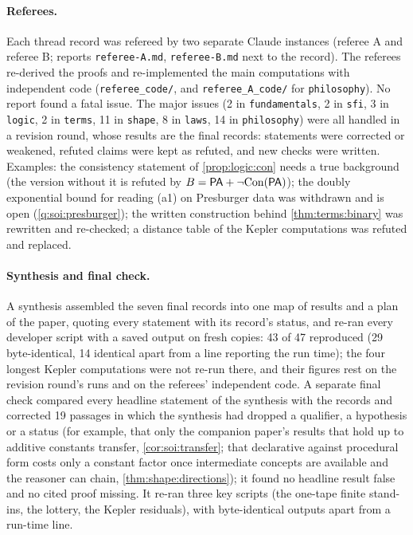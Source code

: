 \paragraph{Referees.} Each thread record was refereed by two separate Claude instances (referee A and referee B; reports \texttt{referee-A.md}, \texttt{referee-B.md} next to the record). The referees re-derived the proofs and re-implemented the main computations with independent code (\texttt{referee\_code/}, and \texttt{referee\_A\_code/} for \texttt{philosophy}). No report found a fatal issue. The major issues (2 in \texttt{fundamentals}, 2 in \texttt{sfi}, 3 in \texttt{logic}, 2 in \texttt{terms}, 11 in \texttt{shape}, 8 in \texttt{laws}, 14 in \texttt{philosophy}) were all handled in a revision round, whose results are the final records: statements were corrected or weakened, refuted claims were kept as refuted, and new checks were written. Examples: the consistency statement of \cref{prop:logic:con} needs a true background (the version without it is refuted by $B=\mathsf{PA}+\neg\mathrm{Con}(\mathsf{PA})$); the doubly exponential bound for reading (a1) on Presburger data was withdrawn and is open (\cref{q:soi:presburger}); the written construction behind \cref{thm:terms:binary} was rewritten and re-checked; a distance table of the Kepler computations was refuted and replaced.

\paragraph{Synthesis and final check.} A synthesis assembled the seven final records into one map of results and a plan of the paper, quoting every statement with its record's status, and re-ran every developer script with a saved output on fresh copies: 43 of 47 reproduced (29 byte-identical, 14 identical apart from a line reporting the run time); the four longest Kepler computations were not re-run there, and their figures rest on the revision round's runs and on the referees' independent code. A separate final check compared every headline statement of the synthesis with the records and corrected 19 passages in which the synthesis had dropped a qualifier, a hypothesis or a status (for example, that only the companion paper's results that hold up to additive constants transfer, \cref{cor:soi:transfer}; that declarative against procedural form costs only a constant factor once intermediate concepts are available and the reasoner can chain, \cref{thm:shape:directions}); it found no headline result false and no cited proof missing. It re-ran three key scripts (the one-tape finite stand-ins, the lottery, the Kepler residuals), with byte-identical outputs apart from a run-time line.


